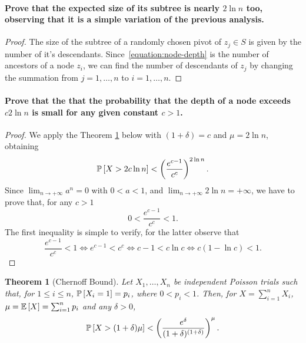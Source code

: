 \paragraph{Prove that the expected size of its subtree is nearly $2 \ln n$ too,
observing that it is a simple variation of the previous analysis.}

\begin{proof}
  The size of the subtree of a randomly chosen pivot of $z_j\in S$ is given by
  the number of it's descendants. Since~\eqref{equation:node-depth} is the
  number of ancestors of a node $z_i$, we can find the number of descendants of
  $z_j$ by changing the summation from $j=1,\dotsc,n$ to $i=1,\dotsc,n$.
\end{proof}

\paragraph{Prove that the that the probability that the depth of a node exceeds $c2 \ln n$ is small for any given constant $c > 1$.}

\begin{proof}
  We apply the Theorem \ref{theorem:chernoff} below with $(1+\delta)=c$ and $\mu=2 \ln n$, obtaining
  $$\operatorname*{\mathbb{P}}\left[{X>2c\ln n}\right]<\left(\frac{e^{c-1}}{c^c}\right)^{2 \ln n}.$$
  Since $\lim_{n\to+\infty}a^n=0$ with $0<a<1$, and $\lim_{n\to+\infty}2\ln n= +\infty$, we have to prove that, for any $c>1$
  $$0<\frac{e^{c-1}}{c^c}<1.$$
  The first inequality is simple to verify, for the latter observe that
  $$\frac{e^{c-1}}{c^c}<1 \iff e^{c-1}<c^c \iff c-1 < c\ln c \iff c(1-\ln c)<1.$$
\end{proof}

\newtheorem{thm}{Theorem}
\begin{thm}[Chernoff Bound]\label{theorem:chernoff}
  Let $X_1, \dots, X_n$ be independent Poisson trials such that, for $1 \leq i \leq n$, $\operatorname*{\mathbb{P}}\left[{X_i=1}\right]=p_i$, where $0 < p_i < 1$. Then, for $X=\sum_{i=1}^n X_i$, $\mu=\mathbb{E}\left[{X}\right]=\sum_{i=1}^n p_i$ and any $\delta>0$,
	$$\operatorname*{\mathbb{P}}\left[{X>(1+\delta )\mu}\right]<\left({\frac {e^{\delta }}{(1+\delta )^{(1+\delta )}}}\right)^\mu.$$
\end{thm}